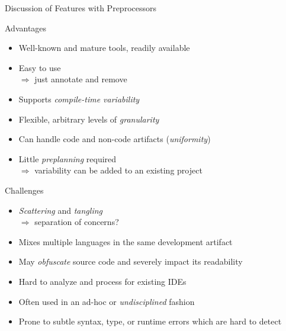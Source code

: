\begin{frame}{Discussion of Features with Preprocessors}
	\begin{mycolumns}[animation=none]
		\begin{note}{Advantages}
			\begin{itemize}
				\item Well-known and mature tools, readily available
				\item Easy to use\\
				$\Rightarrow$ just annotate and remove
				\item Supports \emph{compile-time variability}
				\item Flexible, arbitrary levels of \emph{granularity}
				\item Can handle code and non-code artifacts (\emph{uniformity})
				\item Little \emph{preplanning} required\\
				$\Rightarrow$ variability can be added to an existing project
			\end{itemize}
		\end{note}
	\mynextcolumn
		\pause
		\begin{note}{Challenges}
			\begin{itemize}
				\item \emph{Scattering} and \emph{tangling}\\
				$\Rightarrow$ separation of concerns?
				\item Mixes multiple languages in the same development artifact
				\item May \emph{obfuscate} source code and severely impact its readability
				\item Hard to analyze and process for existing IDEs
				\item Often used in an ad-hoc or \emph{undisciplined} fashion
				\item Prone to subtle syntax, type, or runtime errors which are hard to detect
			\end{itemize}
		\end{note}
	\end{mycolumns}
\end{frame}



